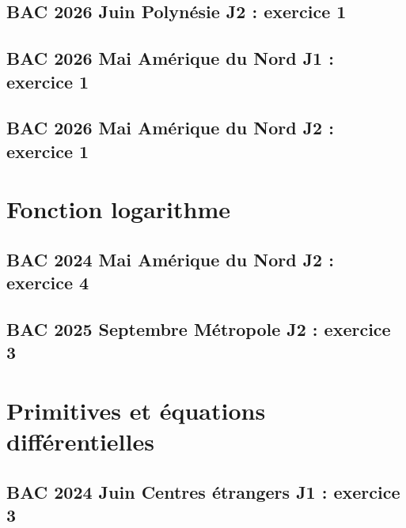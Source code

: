 \documentclass[lang=fr,edition=teacher,layout=sheet]{mxbook}
\begin{document}
\begingroup\endgroup
\par\bigskip
{}\subsection*{BAC 2026 Juin Polynésie J2 : exercice 1}
\begingroup\endgroup
\par\bigskip
{}\subsection*{BAC 2026 Mai Amérique du Nord J1 : exercice 1}
\begingroup\endgroup
\par\bigskip
{}\subsection*{BAC 2026 Mai Amérique du Nord J2 : exercice 1}
\begingroup\endgroup
\par\bigskip
\clearpage\section*{Fonction logarithme}
\subsection*{BAC 2024 Mai Amérique du Nord J2 : exercice 4}
\begingroup\endgroup
\par\bigskip
{}\subsection*{BAC 2025 Septembre Métropole J2 : exercice 3}
\begingroup\endgroup
\par\bigskip
\clearpage\section*{Primitives et équations différentielles}
\subsection*{BAC 2024 Juin Centres étrangers J1 : exercice 3}
\end{document}
